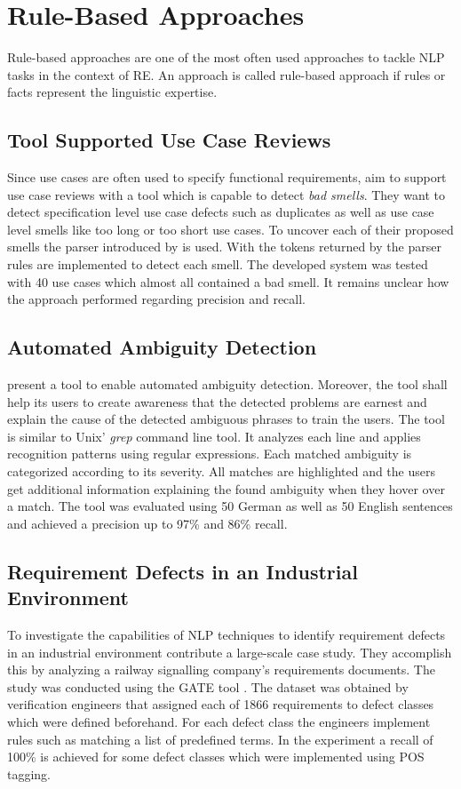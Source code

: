 \section{Rule-Based Approaches}
\label{chp:related_research:sec:rule_based approaches}
Rule-based approaches are one of the most often used approaches to tackle \ac{NLP} tasks in the context of \ac{RE}.
An approach is called rule-based approach if rules or facts represent the linguistic expertise. \parencite{Zhao:2020}

\subsection{Tool Supported Use Case Reviews}
Since use cases are often used to specify functional requirements, \textcite{Ciemniewska:2007} aim to support use case reviews with a tool which is capable to detect \textit{bad smells}.
They want to detect specification level use case defects such as duplicates as well as use case level smells like too long or too short use cases.
To uncover each of their proposed smells the parser introduced by \textcite{Klein:2002} is used.
With the tokens returned by the parser rules are implemented to detect each smell.
The developed system was tested with 40 use cases which almost all contained a bad smell.
It remains unclear how the approach performed regarding precision and recall.

\subsection{Automated Ambiguity Detection}
\textcite{Gleich:2010} present a tool to enable automated ambiguity detection.
Moreover, the tool shall help its users to create awareness that the detected problems are earnest and explain the cause of the detected ambiguous phrases to train the users.
The tool is similar to Unix' \textit{grep} command line tool.
It analyzes each line and applies recognition patterns using regular expressions.
Each matched ambiguity is categorized according to its severity.
All matches are highlighted and the users get additional information explaining the found ambiguity when they hover over a match.
The tool was evaluated using 50 German as well as 50 English sentences and achieved a precision up to 97\% and 86\% recall.

\subsection{Requirement Defects in an Industrial Environment}
To investigate the capabilities of \ac{NLP} techniques to identify requirement defects in an industrial environment \textcite{Rosadini:2017} contribute a large-scale case study.
They accomplish this by analyzing a railway signalling company's requirements documents.
The study was conducted using the \ac{GATE} tool \parencite{Cunningham:2002}.
The dataset was obtained by verification engineers that assigned each of 1866 requirements to defect classes which were defined beforehand.
For each defect class the engineers implement rules such as matching a list of predefined terms.
In the experiment a recall of 100\% is achieved for some defect classes which were implemented using \ac{POS} tagging.

